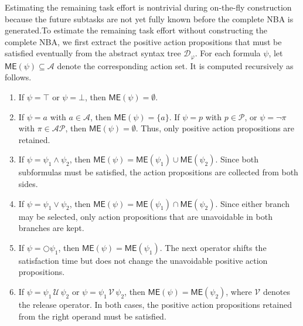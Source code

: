 \documentclass[lettersize,journal]{IEEEtran}
\theoremstyle{italiclemma}
\theoremstyle{italiclemma}
\theoremstyle{definition}
\begin{document}
Estimating the remaining task effort is nontrivial during on-the-fly construction because the future subtasks are not yet fully known before the complete NBA is generated.To estimate the remaining task effort without constructing the complete NBA, we first extract the positive action propositions that must  be satisfied eventually from the abstract syntax tree $\mathcal D_\varphi$.  For each formula $\psi$, let $\mathsf{ME}(\psi)\subseteq\mathcal A$ denote the corresponding action set. It is computed recursively as follows.
\begin{enumerate}
\item If $\psi=\top$ or $\psi=\bot$, then
$\mathsf{ME}(\psi)=\emptyset$.
\item If $\psi=a$ with $a\in\mathcal A$, then
$\mathsf{ME}(\psi)=\{a\}$.
If $\psi=p$ with $p\in\mathcal P$, or
$\psi=\neg\pi$ with $\pi\in\mathcal{AP}$, then
$\mathsf{ME}(\psi)=\emptyset$.
Thus, only positive action propositions are retained.
\item If \(\psi=\psi_1\wedge\psi_2\), then $  \mathsf{ME}(\psi)=\mathsf{ME}(\psi_1)\cup \mathsf{ME}(\psi_2).$
    Since both subformulas must be satisfied, the action propositions are collected from both sides.
\item If \(\psi=\psi_1\vee\psi_2\), then $  \mathsf{ME}(\psi)= \mathsf{ME}(\psi_1)\cap \mathsf{ME}(\psi_2). $
    Since either branch may be selected, only action propositions that are unavoidable in both branches are kept.
\item If \(\psi=\bigcirc\psi_1\), then $\mathsf{ME}(\psi)=\mathsf{ME}(\psi_1). $ The next operator shifts the satisfaction time but does not change the unavoidable positive action propositions.
\item If
  \(\psi=\psi_1\,\mathcal U\,\psi_2\) or
  \(\psi=\psi_1\,\mathcal V\,\psi_2\), then
  \(\mathsf{ME}(\psi)=\mathsf{ME}(\psi_2)\), where
  \(\mathcal V\) denotes the release operator. In both cases, the
  positive action propositions retained from the right operand must be satisfied.
\end{enumerate}
\end{document}
